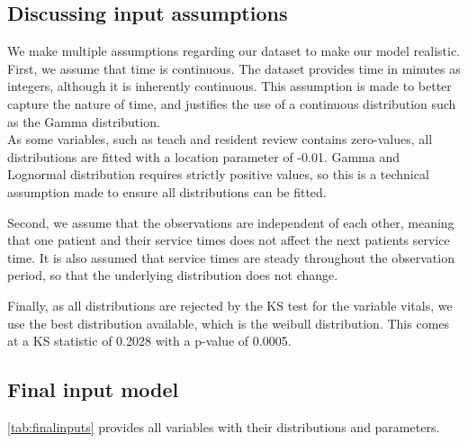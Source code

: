 \subsection{Discussing input assumptions}

We make multiple assumptions regarding our dataset to make our model realistic. First, we assume that time is continuous. The dataset provides time in minutes as integers, although it is inherently continuous. This assumption is made to better capture the nature of time, and justifies the use of a continuous distribution such as the Gamma distribution. \\
As some variables, such as teach and resident review contains zero-values, all distributions are fitted with a location parameter of -0.01. Gamma and Lognormal distribution requires strictly positive values, so this is a technical assumption made to ensure all distributions can be fitted.

Second, we assume that the observations are independent of each other, meaning that one patient and their service times does not affect the next patients service time. It is also assumed that service times are steady throughout the observation period, so that the underlying distribution does not change.

Finally, as all distributions are rejected by the KS test for the variable vitals, we use the best distribution available, which is the weibull distribution. This comes at a KS statistic of 0.2028 with a p-value of 0.0005.

\subsection{Final input model}

\autoref{tab:finalinputs} provides all variables with their distributions and parameters. 

